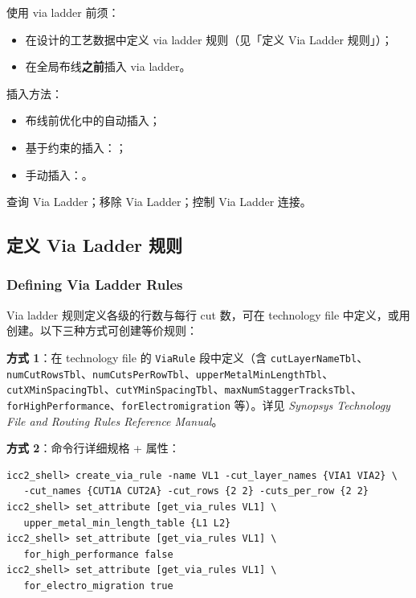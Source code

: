 使用 via ladder 前须：
\begin{itemize}
  \item 在设计的工艺数据中定义 via ladder 规则（见「定义 Via Ladder 规则」）；
  \item 在全局布线\textbf{之前}插入 via ladder。
\end{itemize}

插入方法：
\begin{itemize}
  \item 布线前优化中的自动插入；
  \item 基于约束的插入：；
  \item 手动插入：。
\end{itemize}

\begin{seeAlsoBox}
查询 Via Ladder；移除 Via Ladder；控制 Via Ladder 连接。
\end{seeAlsoBox}

\subsection{定义 Via Ladder 规则}
\subsubsection*{Defining Via Ladder Rules}

Via ladder 规则定义各级的行数与每行 cut 数，可在 technology file 中定义，或用  创建。以下三种方式可创建等价规则：

\textbf{方式 1}：在 technology file 的 \texttt{ViaRule} 段中定义（含 \texttt{cutLayerNameTbl}、\texttt{numCutRowsTbl}、\texttt{numCutsPerRowTbl}、\texttt{upperMetalMinLengthTbl}、\texttt{cutXMinSpacingTbl}、\texttt{cutYMinSpacingTbl}、\texttt{maxNumStaggerTracksTbl}、\texttt{forHighPerformance}、\texttt{forElectromigration} 等）。详见 \textit{Synopsys Technology File and Routing Rules Reference Manual}。

\textbf{方式 2}：命令行详细规格 + 属性：
\begin{lstlisting}
icc2_shell> create_via_rule -name VL1 -cut_layer_names {VIA1 VIA2} \
   -cut_names {CUT1A CUT2A} -cut_rows {2 2} -cuts_per_row {2 2}
icc2_shell> set_attribute [get_via_rules VL1] \
   upper_metal_min_length_table {L1 L2}
icc2_shell> set_attribute [get_via_rules VL1] \
   for_high_performance false
icc2_shell> set_attribute [get_via_rules VL1] \
   for_electro_migration true
\end{lstlisting}

